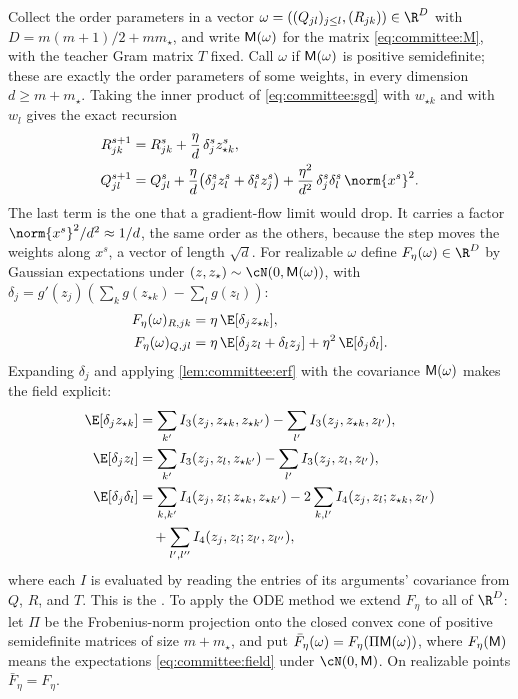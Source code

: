 \begin{refsection}
Collect the order parameters in a vector $\omega=((Q_{jl})_{j\le l},(R_{jk}))\in\R^D$ with $D=m(m+1)/2+mm_\star$, and write $\mathsf{M}(\omega)$ for the matrix \eqref{eq:committee:M}, with the teacher Gram matrix $T$ fixed. Call $\omega$  if $\mathsf{M}(\omega)$ is positive semidefinite; these are exactly the order parameters of some weights, in every dimension $d\ge m+m_\star$. Taking the inner product of \eqref{eq:committee:sgd} with $w_{\star k}$ and with $w_l$ gives the exact recursion
\begin{equation}\label{eq:committee:recursion}
\begin{aligned}
  R_{jk}^{s+1}&=R_{jk}^s+\frac\eta d\,\delta_j^sz_{\star k}^s,\\
  Q_{jl}^{s+1}&=Q_{jl}^s+\frac\eta d\bigl(\delta_j^sz_l^s+\delta_l^sz_j^s\bigr)+\frac{\eta^2}{d^2}\,\delta_j^s\delta_l^s\,\norm{x^s}^2 .
\end{aligned}
\end{equation}
The last term is the one that a gradient-flow limit would drop. It carries a factor $\norm{x^s}^2/d^2\approx1/d$, the same order as the others, because the step moves the weights along $x^s$, a vector of length $\sqrt d$. For realizable $\omega$ define $F_\eta(\omega)\in\R^D$ by Gaussian expectations under $(z,z_\star)\sim\cN(0,\committeeM(\omega))$, with $\delta_j=g'(z_j)(\sum_kg(z_{\star k})-\sum_lg(z_l))$:
\begin{equation}\label{eq:committee:field}
\begin{aligned}
  F_\eta(\omega)_{R,jk}&=\eta\,\E[\delta_jz_{\star k}],\\
  F_\eta(\omega)_{Q,jl}&=\eta\,\E[\delta_jz_l+\delta_lz_j]+\eta^2\,\E[\delta_j\delta_l].
\end{aligned}
\end{equation}
Expanding $\delta_j$ and applying \cref{lem:committee:erf} with the covariance $\mathsf{M}(\omega)$ makes the field explicit:
\begin{align*}
  \E[\delta_jz_{\star k}]&=\sum_{k'}I_3(z_j,z_{\star k},z_{\star k'})-\sum_{l'}I_3(z_j,z_{\star k},z_{l'}),\\
  \E[\delta_jz_l]&=\sum_{k'}I_3(z_j,z_l,z_{\star k'})-\sum_{l'}I_3(z_j,z_l,z_{l'}),\\
  \E[\delta_j\delta_l]&=\sum_{k,k'}I_4(z_j,z_l;z_{\star k},z_{\star k'})-2\sum_{k,l'}I_4(z_j,z_l;z_{\star k},z_{l'})\\
  &\quad+\sum_{l',l''}I_4(z_j,z_l;z_{l'},z_{l''}),
\end{align*}
where each $I$ is evaluated by reading the entries of its arguments' covariance from $Q$, $R$, and $T$. This is the . To apply the ODE method we extend $F_\eta$ to all of $\R^D$: let $\Pi$ be the Frobenius-norm projection onto the closed convex cone of positive semidefinite matrices of size $m+m_\star$, and put $\bar F_\eta(\omega)=F_\eta(\Pi\mathsf{M}(\omega))$, where $F_\eta(\mathsf{M})$ means the expectations \eqref{eq:committee:field} under $\cN(0,\committeeM)$. On realizable points $\bar F_\eta=F_\eta$.


\end{refsection}
